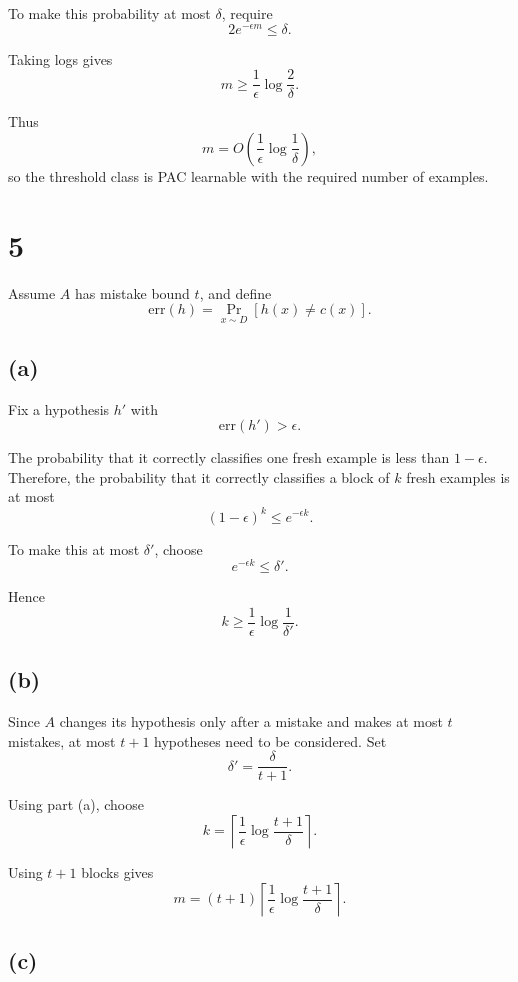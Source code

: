 \documentclass[11pt]{article}
\begin{document}
To make this probability at most \(\delta\), require
\[
2e^{-\epsilon m}\le\delta.
\]

Taking logs gives
\[
\boxed{
m\ge\frac{1}{\epsilon}\log\frac{2}{\delta}.
}
\]

Thus
\[
\boxed{
m=
O\!\left(
\frac{1}{\epsilon}\log\frac{1}{\delta}
\right),
}
\]
so the threshold class is PAC learnable with the required number of examples.

\section*{5}

Assume \(A\) has mistake bound \(t\), and define
\[
\mathrm{err}(h)=\Pr_{x\sim D}[h(x)\neq c(x)].
\]

\subsection*{(a)}

Fix a hypothesis \(h'\) with
\[
\mathrm{err}(h')>\epsilon.
\]

The probability that it correctly classifies one fresh example is less than
\(1-\epsilon\). Therefore, the probability that it correctly classifies a
block of \(k\) fresh examples is at most
\[
(1-\epsilon)^k\le e^{-\epsilon k}.
\]

To make this at most \(\delta'\), choose
\[
e^{-\epsilon k}\le\delta'.
\]

Hence
\[
\boxed{
k\ge\frac{1}{\epsilon}\log\frac{1}{\delta'}.
}
\]

\subsection*{(b)}

Since \(A\) changes its hypothesis only after a mistake and makes at most
\(t\) mistakes, at most \(t+1\) hypotheses need to be considered. Set
\[
\delta'=\frac{\delta}{t+1}.
\]

Using part (a), choose
\[
\boxed{
k=
\left\lceil
\frac{1}{\epsilon}\log\frac{t+1}{\delta}
\right\rceil.
}
\]

Using \(t+1\) blocks gives
\[
\boxed{
m=(t+1)
\left\lceil
\frac{1}{\epsilon}\log\frac{t+1}{\delta}
\right\rceil.
}
\]

\subsection*{(c)}
\end{document}
